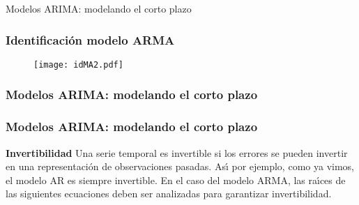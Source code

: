 \documentclass[spanish,xcolor=table]{beamer}
\begin{document}
\begin{section}{Modelos ARIMA: modelando el corto plazo}
\begin{frame}
\end{frame}
\begin{frame}
\frametitle{Identificaci\'on modelo ARMA }


\begin{figure}[t!]
\texttt{[image: idMA2.pdf]}
\end{figure}


\end{frame}
\begin{frame}
\frametitle{Modelos ARIMA: modelando el corto plazo}

 
\end{frame}

\begin{frame}
\frametitle{Modelos ARIMA: modelando el corto plazo}

\textbf{Invertibilidad}
Una serie temporal es invertible si los errores se pueden invertir en una representaci\'on de observaciones pasadas. As\'{\i} por ejemplo, como ya vimos, el modelo AR es siempre invertible.
En el caso del modelo ARMA, las ra\'{\i}ces de las siguientes ecuaciones deben ser analizadas para garantizar invertibilidad.


\end{frame}
\end{section}
\end{document}
